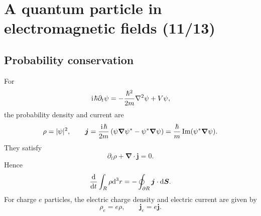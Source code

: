 \section{A quantum particle in electromagnetic fields (11/13)}


\subsection{Probability conservation}
For
\begin{equation}
\hspace{1pt}\mathrm{i}\hspace{1pt}\hbar\partial_t\psi
=-\frac{\hbar^2}{2m}\nabla^2\psi+V\psi,
\end{equation}
the probability density and current are
\begin{equation}
\rho=|\psi|^2,
\qquad
\bm j=\frac{\hspace{1pt}\mathrm{i}\hspace{1pt}\hbar}{2m}
\left(\psi\bm\nabla\psi^*-\psi^*\bm\nabla\psi\right)
=\frac{\hbar}{m}\operatorname{Im}(\psi^*\bm\nabla\psi).
\end{equation}
They satisfy
\begin{equation}
\boxed{\partial_t\rho+\bm\nabla\cdot\bm j=0.}
\end{equation}
Hence
\begin{equation}
\frac{\mathrm{d}}{\mathrm{d} t}\int_R\rho\mathrm{d}^3r
=-\oint_{\partial R}\bm j\cdot\mathrm{d}\bm S.
\end{equation}
For charge $e$ particles, the electric charge density and electric current are given by
\begin{equation}
\rho_e=e\rho,
\qquad
\bm j_e=e\bm j.
\end{equation}

